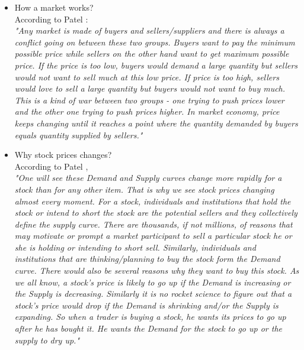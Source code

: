 	\begin{itemize}
		\item How a market works? \\
		According to Patel \cite[p. 24]{P2007}: \\ \emph{"Any market is made of buyers and sellers/suppliers and there is always a conflict going on between these two groups. Buyers want to pay the minimum possible price while sellers on the other hand want to get maximum possible price. If the price is too low, buyers would demand a large quantity but sellers would not want to sell much at this low price. If price is too high, sellers would love to sell a large quantity but buyers would not want to buy much. This is a kind of war between two groups - one trying to push prices lower and the other one trying to push prices higher. In market economy, price keeps changing until it reaches a point where the quantity demanded by buyers equals quantity supplied by sellers."}
		
		\item Why stock prices changes?\\
		According to Patel \cite[p. 24]{P2007}, \\ \emph{"One will see these Demand and Supply curves change more rapidly for a stock than for any other item. That is why we see stock prices changing almost every moment. For a stock, individuals and institutions that hold the stock or intend to short the stock are the potential sellers and they collectively define the supply curve. There are thousands, if not millions, of reasons that may motivate or prompt a market participant to sell a particular stock he or she is holding or intending to short sell. Similarly, individuals and institutions that are thinking/planning to buy the stock form the Demand curve. There would also be several reasons why they want to buy this stock. As we all know, a stock’s price is likely to go up if the Demand is increasing or the Supply is decreasing. Similarly it is no rocket science to figure out that a stock’s price would drop if the Demand is shrinking and/or the Supply is expanding. So when a trader is buying a stock, he wants its prices to go up after he has bought it. He wants the Demand for the stock to go up or the supply to dry up."}
		

\end{itemize}
